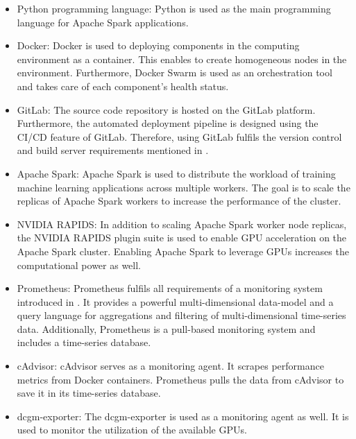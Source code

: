 \begin{itemize}
\item Python programming language: Python is used as the main programming language for Apache Spark applications.

\item Docker: Docker is used to deploying components in the computing environment as a container. This enables to create homogeneous nodes in the environment. Furthermore, Docker Swarm is used as an orchestration tool and takes care of each component's health status.

\item GitLab: The source code repository is hosted on the GitLab platform. Furthermore, the automated deployment pipeline is designed using the CI/CD feature of GitLab. Therefore, using GitLab fulfils the version control and build server requirements mentioned in .

\item Apache Spark: Apache Spark is used to distribute the workload of training machine learning applications across multiple workers. The goal is to scale the replicas of Apache Spark workers to increase the performance of the cluster.

\item NVIDIA RAPIDS: In addition to scaling Apache Spark worker node replicas, the NVIDIA RAPIDS plugin suite is used to enable GPU acceleration on the Apache Spark cluster. Enabling Apache Spark to leverage GPUs increases the computational power as well.

\item Prometheus: 
Prometheus fulfils all requirements of a monitoring system introduced in . It provides a powerful multi-dimensional data-model and a query language for aggregations and filtering of multi-dimensional time-series data. Additionally, Prometheus is a pull-based monitoring system and includes a time-series database.

\item cAdvisor:
cAdvisor serves as a monitoring agent. It scrapes performance metrics from Docker containers. Prometheus pulls the data from cAdvisor to save it in its time-series database.

\item dcgm-exporter:
The dcgm-exporter is used as a monitoring agent as well. It is used to monitor the utilization of the available GPUs.
\end{itemize}


